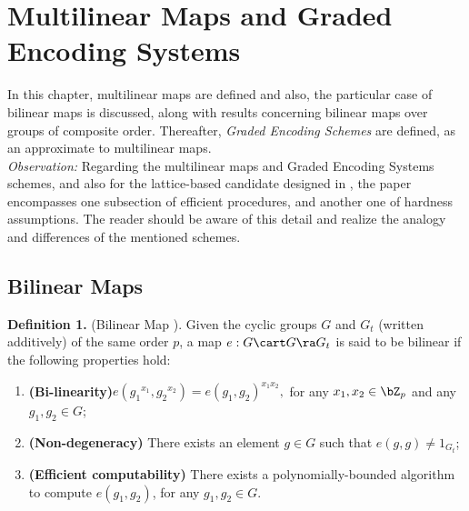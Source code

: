 \chapter{Multilinear Maps and Graded Encoding Systems}

In this chapter, multilinear maps are defined and also, the particular case of bilinear maps is discussed, along with results concerning bilinear maps over groups of composite order. Thereafter, \textit{Graded Encoding Schemes} are defined, as an approximate to multilinear maps. \\

\textit{Observation:} Regarding the multilinear maps and Graded Encoding Systems schemes, and also for the lattice-based candidate designed in \cite{GGH13}, the paper encompasses one subsection of efficient procedures, and another one of hardness assumptions. The reader should be aware of this detail and realize the analogy and differences of the mentioned schemes.


\section{Bilinear Maps}
\textbf{Definition 1.} (Bilinear Map \cite{BCM16}). Given the cyclic groups $G$ and $G_t$ (written additively) of the same order $p$, a map $e:G \cart G \ra G_t$ is said to be bilinear if the following properties hold:
\begin{enumerate}
	\item \textbf{(Bi-linearity)}\space  $e({g_1}^{x_1}, {g_2}^{x_2}) = e(g_1,g_2)^{x_1x_2},$ for any $x_1,x_2 \in \bZ_p$ and any $g_1, g_2 \in G$;
	\item  \textbf{(Non-degeneracy)} \space There exists an element $g\in G$ such that $e(g, g) \neq 1_{G_t}$;
	\item \textbf{(Efficient computability)} There exists a polynomially-bounded algorithm to compute $e(g_1,g_2)$, for any $g_1,g_2 \in G$.
\end{enumerate}